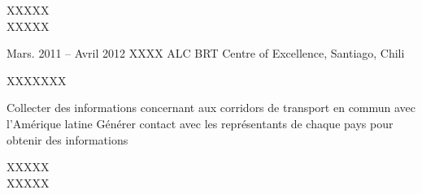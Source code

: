 \documentclass[30pt, french]{tccv}
\begin{document}
\begin{upshape}
\begin{experience}
\begin{itemize}
 
 XXXXX \\
\mission{}           XXXXX         
\end{itemize}      



  
\setlength{\parskip}{0pt}
\item{Mars. 2011 -- Avril 2012 }     
  {XXXX}     
  {ALC BRT Centre of Excellence, Santiago, Chili}
  \fontsize{9pt}{1em}\color{text}\bodyfontlight\upshape\selectfont

 XXXXXXX  \\
  
\setlength{\parskip}{-10pt}
\begin{itemize}
      \setlength\itemsep{-3pt} 

      \cvitem[\checkmark] Collecter des informations concernant aux corridors de transport en commun avec l'Amérique latine
      \cvitem[\checkmark] Générer contact avec les représentants de chaque pays pour obtenir des informations
     
\end{itemize}        

 XXXXX \\
\mission{}           XXXXX
\end{experience}






\end{upshape}
\end{document}
